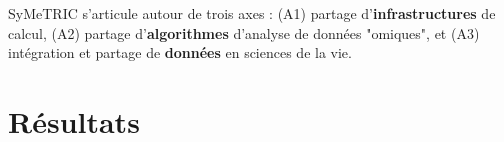 \documentclass[a4paper,11pt]{article}
\theoremstyle{definition}
\begin{document}
\begin{tcolorbox}
SyMeTRIC s'articule autour de trois axes : (A1) partage d'{\bf infrastructures} de calcul, (A2) partage d'{\bf algorithmes} d'analyse de données "omiques", et (A3) intégration et partage de {\bf données} en sciences de la vie. 
\end{tcolorbox}




\section{Résultats}
\end{document}
